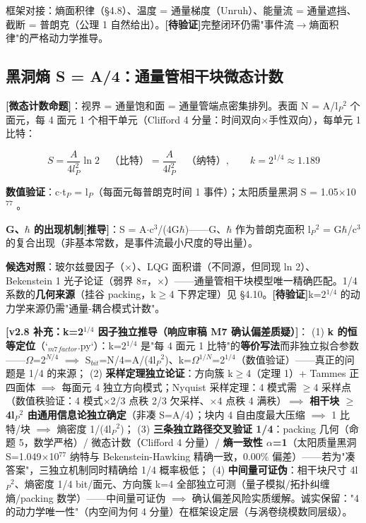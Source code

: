 \documentclass[UTF8,fontset=windows]{csoarticle}
\newcommand{\mtag}[1]{\textbf{[#1]}}
\newcommand{\up}[1]{\ensuremath{^{#1}}}
\newcommand{\down}[1]{\ensuremath{_{#1}}}
\begin{document}
框架对接：熵面积律（\S{}4.8）、温度 = 通量梯度（Unruh）、能量流 = 通量遮挡、截断 = 普朗克（公理 1 自然给出）。\mtag{待验证}完整闭环仍需"事件流\ensuremath{\to}熵面积律"的严格动力学推导。

\subsection{黑洞熵 S = A/4：通量管相干块微态计数}

\textbf{\mtag{微态计数命题}}：视界 = 通量饱和面 = 通量管端点密集排列。表面 N = A/l\down{P}\up{2} 个面元，每 4 面元 1 个相干单元（Clifford 4 分量：时间双向\ensuremath{\times}手性双向），每单元 1 比特：

\[S = \frac{A}{4l_P^2}\ln 2 \quad\text{（比特）} = \frac{A}{4l_P^2}\quad\text{（纳特）},\qquad k = 2^{1/4} \approx 1.189\]

\textbf{数值验证}：c\ensuremath{\cdot}t\down{P} = l\down{P}（每面元每普朗克时间 1 事件）；太阳质量黑洞 S = 1.05\ensuremath{\times}10\up{77} \checkmark。

\textbf{G、\ensuremath{\hbar} 的出现机制}\mtag{推导}：S = A\ensuremath{\cdot}c\up{3}/(4G\ensuremath{\hbar})------G、\ensuremath{\hbar} 作为普朗克面积 l\down{P}\up{2} = G\ensuremath{\hbar}/c\up{3} 的复合出现（非基本常数，是事件流最小尺度的导出量）。

\textbf{候选对照}：玻尔兹曼因子（\ensuremath{\times}）、LQG 面积谱（不同源，但同现 ln 2）、Bekenstein 1 光子论证（弱界 8\ensuremath{\pi}，\ensuremath{\times}）------通量管相干块模型唯一精确匹配。1/4 系数的\textbf{几何来源}（挂谷 packing，k\ensuremath{\geq}4 下界定理）见 \S{}4.10。\mtag{待验证}k=2\up{1/4} 的动力学来源仍需"通量-耦合模式计数"。

\textbf{\mtag{v2.8 补充：k=2\up{1/4} 因子独立推导（响应审稿 M7 确认偏差质疑）}}：
(1) \textbf{k 的恒等定位}（`\down{m7}\down{factor}.py`）：k=2\up{1/4} 是"每 4 面元 1 比特"的\textbf{等价写法}而非独立拟合参数------\ensuremath{\Omega}=2\up{N/4} \ensuremath{\implies} S\down{bit}=N/4=A/(4l\down{P}\up{2})、k=\ensuremath{\Omega}\up{1/N}=2\up{1/4}（数值验证）------真正的问题是 1/4 的来源；
(2) \textbf{采样定理独立论证}：方向簇 k\ensuremath{\geq}4（定理 1）+ Tammes 正四面体 \ensuremath{\implies} 每面元 4 独立方向模式；Nyquist 采样定理：4 模式需 \ensuremath{\geq}4 采样点（数值秩验证：4 模式\ensuremath{\times}2/3 点秩 2/3 欠采样、\ensuremath{\times}4 点秩 4 满秩）\ensuremath{\implies} \textbf{相干块 \ensuremath{\geq} 4l\down{P}\up{2} 由通用信息论独立确定}（非凑 S=A/4）；块内 4 自由度最大压缩 \ensuremath{\implies} 1 比特/块 \ensuremath{\implies} 熵密度 1/(4l\down{P}\up{2})；
(3) \textbf{三条独立路径交叉验证 1/4}：packing 几何（命题 5，数学严格）/ 微态计数（Clifford 4 分量）/ \textbf{熵一致性 \ensuremath{\alpha}=1}（太阳质量黑洞 S=1.049\ensuremath{\times}10\up{77} 纳特与 Bekenstein-Hawking 精确一致，0.00\% 偏差）------若为"凑答案"，三独立机制同时精确给 1/4 概率极低；
(4) \textbf{中间量可证伪}：相干块尺寸 4l\down{P}\up{2}、熵密度 1/4 bit/面元、方向簇 k=4 全部独立可测（量子模拟/拓扑纠缠熵/packing 数学）------中间量可证伪 \ensuremath{\implies} 确认偏差风险实质缓解。诚实保留："4 的动力学唯一性"（内空间为何 4 分量）在框架设定层（与涡卷绕模数同层级）。
\end{document}
